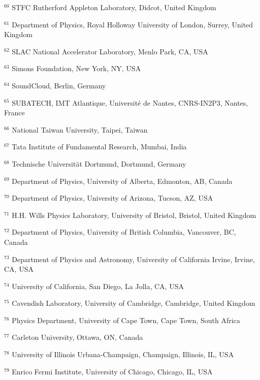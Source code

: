 \par {\footnotesize $^{60}$ STFC Rutherford Appleton Laboratory, Didcot, United Kingdom}
\par {\footnotesize $^{61}$ Department of Physics, Royal Holloway University of London, Surrey, United Kingdom}
\par {\footnotesize $^{62}$ SLAC National Accelerator Laboratory, Menlo Park, CA, USA}
\par {\footnotesize $^{63}$ Simons Foundation, New York, NY, USA}
\par {\footnotesize $^{64}$ SoundCloud, Berlin, Germany}
\par {\footnotesize $^{65}$ SUBATECH, IMT Atlantique, Université de Nantes, CNRS-IN2P3, Nantes, France}
\par {\footnotesize $^{66}$ National Taiwan University, Taipei, Taiwan}
\par {\footnotesize $^{67}$ Tata Institute of Fundamental Research, Mumbai, India}
\par {\footnotesize $^{68}$ Technische Universit\"at Dortmund, Dortmund, Germany}
\par {\footnotesize $^{69}$ Department of Physics, University of Alberta, Edmonton, AB, Canada}
\par {\footnotesize $^{70}$ Department of Physics, University of Arizona, Tucson, AZ, USA}
\par {\footnotesize $^{71}$ H.H. Wills Physics Laboratory, University of Bristol, Bristol, United Kingdom}
\par {\footnotesize $^{72}$ Department of Physics, University of British Columbia, Vancouver, BC, Canada}
\par {\footnotesize $^{73}$ Department of Physics and Astronomy, University of California Irvine, Irvine, CA, USA}
\par {\footnotesize $^{74}$ University of California, San Diego, La Jolla, CA, USA}
\par {\footnotesize $^{75}$ Cavendish Laboratory, University of Cambridge, Cambridge, United Kingdom}
\par {\footnotesize $^{76}$ Physics Department, University of Cape Town, Cape Town, South Africa}
\par {\footnotesize $^{77}$ Carleton University, Ottawa, ON, Canada}
\par {\footnotesize $^{78}$ University of Illinois Urbana-Champaign, Champaign, Illinois, IL, USA}
\par {\footnotesize $^{79}$ Enrico Fermi Institute, University of Chicago, Chicago, IL, USA}
